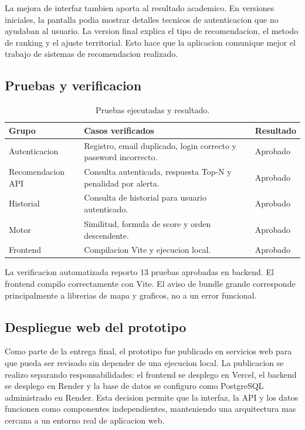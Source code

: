 \documentclass[12pt,a4paper]{article}
\begin{document}
La mejora de interfaz tambien aporta al resultado academico. En versiones iniciales, la pantalla podia mostrar detalles tecnicos de autenticacion que no ayudaban al usuario. La version final explica el tipo de recomendacion, el metodo de ranking y el ajuste territorial. Esto hace que la aplicacion comunique mejor el trabajo de sistemas de recomendacion realizado.

\subsection{Pruebas y verificacion}
\begin{table}[H]
\centering
\caption{Pruebas ejecutadas y resultado.}
\label{tab:pruebas}
\small
\begin{tabular}{p{4cm}p{6.8cm}p{2cm}}
\toprule
Grupo & Casos verificados & Resultado \\
\midrule
Autenticacion & Registro, email duplicado, login correcto y password incorrecto. & Aprobado \\
Recomendacion API & Consulta autenticada, respuesta Top-N y penalidad por alerta. & Aprobado \\
Historial & Consulta de historial para usuario autenticado. & Aprobado \\
Motor & Similitud, formula de score y orden descendente. & Aprobado \\
Frontend & Compilacion Vite y ejecucion local. & Aprobado \\
\bottomrule
\end{tabular}
\end{table}

La verificacion automatizada reporto 13 pruebas aprobadas en backend. El frontend compilo correctamente con Vite. El aviso de bundle grande corresponde principalmente a librerias de mapa y graficos, no a un error funcional.

\subsection{Despliegue web del prototipo}
Como parte de la entrega final, el prototipo fue publicado en servicios web para que pueda ser revisado sin depender de una ejecucion local. La publicacion se realizo separando responsabilidades: el frontend se desplego en Vercel, el backend se desplego en Render y la base de datos se configuro como PostgreSQL administrado en Render. Esta decision permite que la interfaz, la API y los datos funcionen como componentes independientes, manteniendo una arquitectura mas cercana a un entorno real de aplicacion web.
\end{document}
